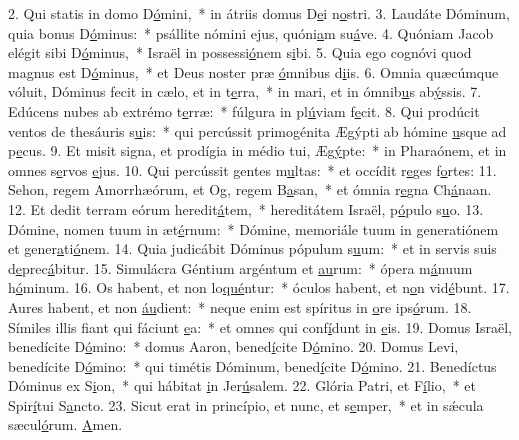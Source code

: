 2. Qui statis in domo D\uline{ó}mini,~* in átriis domus D\uline{e}i n\uline{o}stri.
3. Laudáte Dóminum, quia bonus D\uline{ó}minus:~* psállite nómini ejus, quóni\uline{a}m su\uline{á}ve.
4. Quóniam Jacob elégit sibi D\uline{ó}minus,~* Israël in possessi\uline{ó}nem s\uline{i}bi.
5. Quia ego cognóvi quod magnus est D\uline{ó}minus,~* et Deus noster præ \uline{ó}mnibus d\uline{i}is.
6. Omnia quæcúmque vóluit, Dóminus fecit in cælo, et in t\uline{e}rra,~* in mari, et in ómnib\uline{u}s ab\uline{ý}ssis.
7. Edúcens nubes ab extrémo t\uline{e}rræ:~* fúlgura in pl\uline{ú}viam f\uline{e}cit.
8. Qui prodúcit ventos de thesáuris s\uline{u}is:~* qui percússit primogénita Ægýpti ab hómine \uline{u}sque ad p\uline{e}cus.
9. Et misit signa, et prodígia in médio tui, Æg\uline{ý}pte:~* in Pharaónem, et in omnes s\uline{e}rvos \uline{e}jus.
10. Qui percússit gentes m\uline{u}ltas:~* et occídit r\uline{e}ges f\uline{o}rtes:
11. Sehon, regem Amorrhæórum, et Og, regem B\uline{a}san,~* et ómnia r\uline{e}gna Ch\uline{á}naan.
12. Et dedit terram eórum heredit\uline{á}tem,~* hereditátem Israël, p\uline{ó}pulo s\uline{u}o.
13. Dómine, nomen tuum in æt\uline{é}rnum:~* Dómine, memoriále tuum in generatiónem et gener\uline{a}ti\uline{ó}nem.
14. Quia judicábit Dóminus pópulum s\uline{u}um:~* et in servis suis d\uline{e}prec\uline{á}bitur.
15. Simulácra Géntium argéntum et \uline{au}rum:~* ópera m\uline{á}nuum h\uline{ó}minum.
16. Os habent, et non lo\uline{qué}ntur:~* óculos habent, et n\uline{o}n vid\uline{é}bunt.
17. Aures habent, et non \uline{áu}dient:~* neque enim est spíritus in \uline{o}re ips\uline{ó}rum.
18. Símiles illis fiant qui fáciunt \uline{e}a:~* et omnes qui conf\uline{í}dunt in \uline{e}is.
19. Domus Israël, benedícite D\uline{ó}mino:~* domus Aaron, bened\uline{í}cite D\uline{ó}mino.
20. Domus Levi, benedícite D\uline{ó}mino:~* qui timétis Dóminum, bened\uline{í}cite D\uline{ó}mino.
21. Benedíctus Dóminus ex S\uline{i}on,~* qui hábitat \uline{i}n Jer\uline{ú}salem.
22. Glória Patri, et F\uline{í}lio,~* et Spir\uline{í}tui S\uline{a}ncto.
23. Sicut erat in princípio, et nunc, et s\uline{e}mper,~* et in sǽcula sæcul\uline{ó}rum. \uline{A}men.
